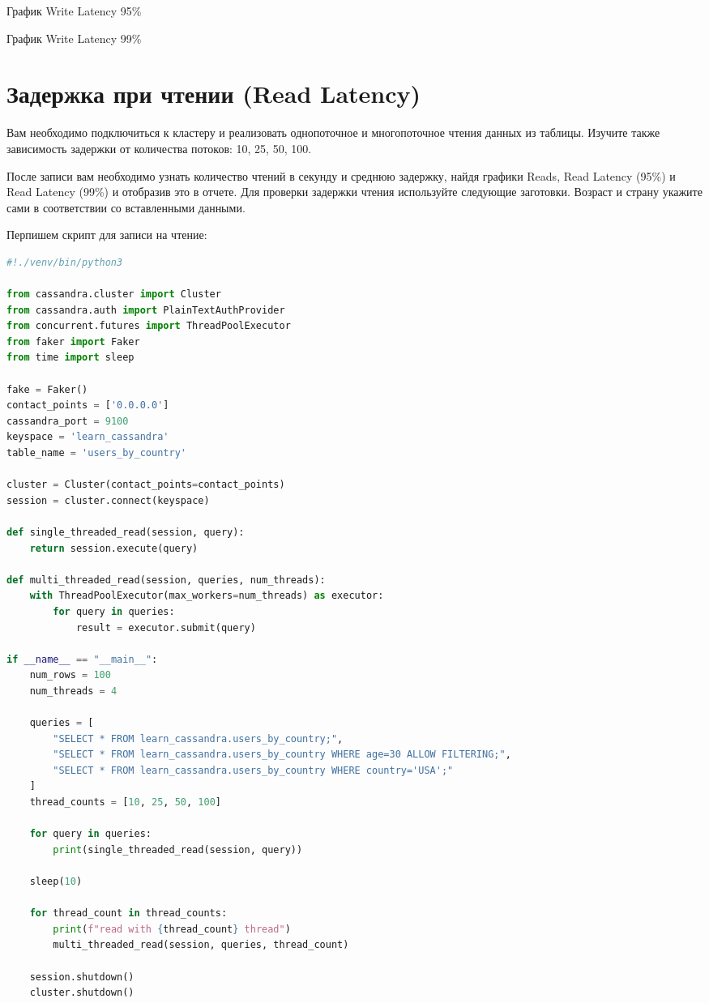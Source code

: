 \begin{image}
	\caption{График Write Latency 95\%}
	\label{fig:write_l95}
\end{image}

\begin{image}
	\caption{График Write Latency 99\%}
	\label{fig:write_l99}
\end{image}

\section{Задержка при чтении (Read Latency)}

Вам необходимо подключиться к кластеру и реализовать однопоточное и
многопоточное чтения данных из таблицы. Изучите также зависимость задержки
от количества потоков: 10, 25, 50, 100.\par
После записи вам необходимо узнать количество чтений в секунду и
среднюю задержку, найдя графики Reads, Read Latency (95\%) и Read Latency
(99\%) и отобразив это в отчете. Для проверки задержки чтения используйте
следующие заготовки. Возраст и страну укажите сами в соответствии со
вставленными данными.

Перпишем скрипт для записи на чтение:

\begin{lstlisting}[language=Python]
#!./venv/bin/python3

from cassandra.cluster import Cluster
from cassandra.auth import PlainTextAuthProvider
from concurrent.futures import ThreadPoolExecutor
from faker import Faker
from time import sleep

fake = Faker()
contact_points = ['0.0.0.0']
cassandra_port = 9100
keyspace = 'learn_cassandra'
table_name = 'users_by_country'

cluster = Cluster(contact_points=contact_points)
session = cluster.connect(keyspace)

def single_threaded_read(session, query):
    return session.execute(query)

def multi_threaded_read(session, queries, num_threads):
    with ThreadPoolExecutor(max_workers=num_threads) as executor:
        for query in queries:
            result = executor.submit(query)

if __name__ == "__main__":
    num_rows = 100
    num_threads = 4

    queries = [
        "SELECT * FROM learn_cassandra.users_by_country;",
        "SELECT * FROM learn_cassandra.users_by_country WHERE age=30 ALLOW FILTERING;",
        "SELECT * FROM learn_cassandra.users_by_country WHERE country='USA';"
    ]
    thread_counts = [10, 25, 50, 100]

    for query in queries:
        print(single_threaded_read(session, query))
	
	sleep(10)

    for thread_count in thread_counts:
        print(f"read with {thread_count} thread")
        multi_threaded_read(session, queries, thread_count)

    session.shutdown()
    cluster.shutdown()
\end{lstlisting}


